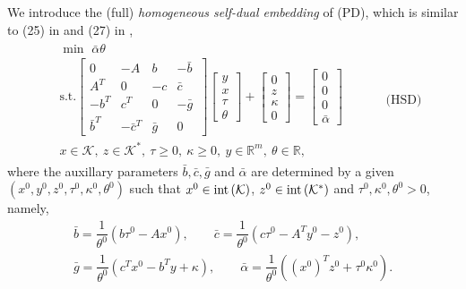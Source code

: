 \documentclass[10pt]{article}
\theoremstyle{definition}
\theoremstyle{plain}
\def\interior{\protect{\textnormal{int}}}
\begin{document}
We introduce the (full) \textit{homogeneous self-dual embedding} of (PD), which is similar to (25) in \cite{SDPT3_2010} and (27) in \cite{CVX},
\begin{align*}
\begin{split}
& \min \,\, \bar{\alpha}\theta \\
& \text{s.t.} \begin{bmatrix}
0 & -A & b & -\bar b\ \\ 
A^T & 0 & -c & \bar c \\
-b^T & c^T& 0 & -\bar g \\
\bar b^T & -\bar c^T & \bar g & 0
\end{bmatrix}
\begin{bmatrix}
y \\ x \\ \tau \\ \theta
\end{bmatrix} + 
\begin{bmatrix}
0 \\ z \\ \kappa \\ 0 
\end{bmatrix} = 
\begin{bmatrix}
0 \\ 0 \\ 0 \\ \bar \alpha
\end{bmatrix}\\
& x \in \mathcal{K},\ z \in \mathcal{K}^*,\ \tau \geq 0,\ \kappa\geq 0,\ y \in \mathbb{R}^m,\ \theta \in \mathbb{R}, 
\end{split} \quad \quad \quad \text{(HSD)}
\end{align*}
where the auxillary parameters $\bar b, \bar c, \bar g$ and $\bar \alpha$ are determined by a given $(x^0, y^0, z^0, \tau^0, \kappa^0, \theta^0)$ such that $x^0 \in \interior \left(\mathcal{K}\right)$, $z^0 \in \interior \left(\mathcal{K}^*\right)$ and $\tau^0, \kappa^0, \theta^0 > 0$, namely,
\begin{align*}
\bar b = \dfrac{1}{\theta^0}\left(b\tau^0 - Ax^0\right),\quad\quad  \bar c = \dfrac{1}{\theta^0}\left(c\tau^0 - A^Ty^0 - z^0\right), \\ 
\bar g = \dfrac{1}{\theta^0}\left(c^T x^0 - b^T y + \kappa\right), \quad\quad  \bar \alpha = \dfrac{1}{\theta^0}\left((x^0)^T z^0 + \tau^0\kappa^0\right).
\end{align*}
\end{document}
